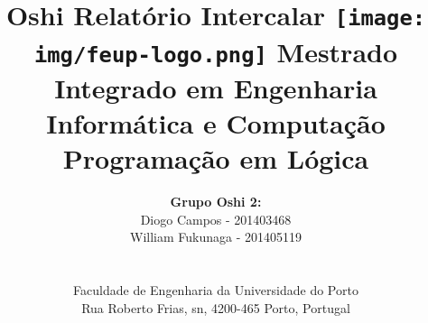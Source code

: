 \documentclass[a4paper]{article}
\begin{document}
\setlength{\voffset}{-2cm}
\setlength{\textwidth}{16cm}
\setlength{\textheight}{24cm}

\title{\Huge\textbf{Oshi}\linebreak\linebreak\linebreak
\Large\textbf{Relatório Intercalar}\linebreak\linebreak
\linebreak\linebreak
\texttt{[image: img/feup-logo.png]}\linebreak\linebreak
\linebreak\linebreak
\Large{Mestrado Integrado em Engenharia Informática e Computação} \linebreak\linebreak
\Large{Programação em Lógica}\linebreak
}

\author{\textbf{Grupo Oshi 2:}\\
Diogo Campos - 201403468 \\
William Fukunaga - 201405119 \\
\linebreak\linebreak \\
 \\ Faculdade de Engenharia da Universidade do Porto \\ Rua Roberto Frias, s\/n, 4200-465 Porto, Portugal \linebreak\linebreak\linebreak
\linebreak\linebreak\vspace{1cm}}

\maketitle
\thispagestyle{empty}


\newpage
\end{document}
